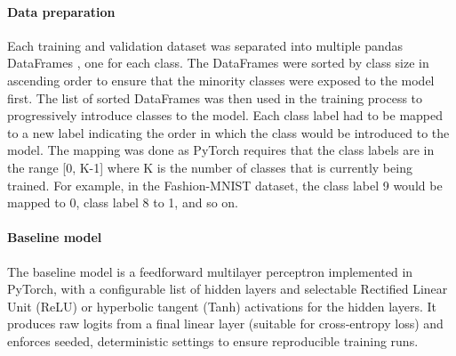 \documentclass[conference]{IEEEtran}
\begin{document}
\paragraph{Data preparation}
Each training and validation dataset was separated into multiple pandas DataFrames \cite{reback2020pandas}, one for each class. The DataFrames were sorted by class size in ascending order to ensure that the minority classes were
exposed to the model first. The list of sorted DataFrames was then used in the training process to progressively introduce classes to the model. Each class label had to be mapped to a new label indicating the order in which the class 
would be introduced to the model. The mapping was done as PyTorch \cite{paszke2019pytorch} requires that the class labels are in the range [0, K-1] where K is the number of classes that is currently being trained. For example, in the Fashion-MNIST dataset, the 
class label 9 would be mapped to 0, class label 8 to 1, and so on.

\paragraph{Baseline model}
The baseline model is a feedforward multilayer perceptron implemented in PyTorch, with a configurable list of hidden layers and selectable Rectified Linear Unit (ReLU) or hyperbolic tangent (Tanh) activations for the hidden layers. It produces raw logits from a 
final linear layer (suitable for cross‑entropy loss) and enforces seeded, deterministic settings to ensure reproducible training runs.
\end{document}
